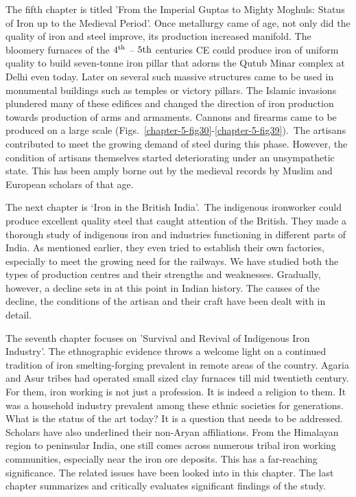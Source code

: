The fifth chapter is titled 'From the Imperial Guptas to Mighty Moghuls: Status of Iron up to the Medieval Period'. Once metallurgy came of age, not only did the quality of iron and steel improve, its production increased manifold. The bloomery furnaces of the $4^{\rm th}$ – $5{\rm th}$ centuries CE could produce iron of uniform quality to build seven-tonne iron pillar that adorns the Qutub Minar complex at Delhi even today. Later on several such massive structures came to be used in monumental buildings such as temples or victory pillars. The Islamic invasions plundered many of these edifices and changed the direction of iron production towards production of arms and armaments. Cannons and firearms came to be produced on a large scale (Figs.~\ref{chapter-5-fig30}-\ref{chapter-5-fig39}).~The artisans contributed to meet the growing demand of steel during this phase. However, the condition of artisans themselves started deteriorating under an unsympathetic state. This has been amply borne out by the medieval records by Muslim and European scholars of that age.

The next chapter is `Iron in the British India'.~The indigenous ironworker could produce excellent quality steel that caught attention of the British. They made a thorough study of indigenous iron and industries functioning in different parts of India. As mentioned earlier, they even tried to establish their own factories, especially to meet the growing need for the railways. We have studied both the types of production centres and their strengths and weaknesses. Gradually, however, a decline sets in at this point in Indian history. The causes of the decline, the conditions of the artisan and their craft have been dealt with in detail.

The seventh chapter focuses on 'Survival and Revival of Indigenous Iron Industry'. The ethnographic evidence throws a welcome light on a continued tradition of iron smelting-forging prevalent in remote areas of the country. Agaria and Asur tribes had operated small sized clay furnaces till mid twentieth century. For them, iron working is not just a profession. It is indeed a religion to them. It was a household industry prevalent among these ethnic societies for generations. What is the status of the art today? It is a question that needs to be addressed. Scholars have also underlined their non-Aryan affiliations. From the Himalayan region to peninsular India, one still comes across numerous tribal iron working communities, especially near the iron ore deposits. This has a far-reaching significance. The related issues have been looked into in this chapter. The last chapter summarizes and critically evaluates significant findings of the study.










